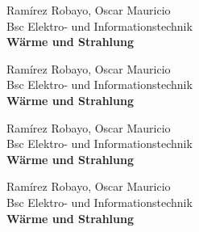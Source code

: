 \documentclass{book}
\begin{document}
\thispagestyle{empty}
\begin{flushright}Ramírez Robayo, Oscar Mauricio\\Bsc Elektro- und Informationstechnik\\\textbf{Wärme und Strahlung}\end{flushright}\noindent\makebox[\linewidth]{\rule{\paperwidth}{0.4pt}}
\clearpage
\thispagestyle{empty}
\begin{flushright}Ramírez Robayo, Oscar Mauricio\\Bsc Elektro- und Informationstechnik\\\textbf{Wärme und Strahlung}\end{flushright}\noindent\makebox[\linewidth]{\rule{\paperwidth}{0.4pt}}
\clearpage
\thispagestyle{empty}
\begin{flushright}Ramírez Robayo, Oscar Mauricio\\Bsc Elektro- und Informationstechnik\\\textbf{Wärme und Strahlung}\end{flushright}\noindent\makebox[\linewidth]{\rule{\paperwidth}{0.4pt}}\clearpage
\thispagestyle{empty}
\begin{flushright}Ramírez Robayo, Oscar Mauricio\\Bsc Elektro- und Informationstechnik\\\textbf{Wärme und Strahlung}\end{flushright}\noindent\makebox[\linewidth]{\rule{\paperwidth}{0.4pt}}
\end{document}
